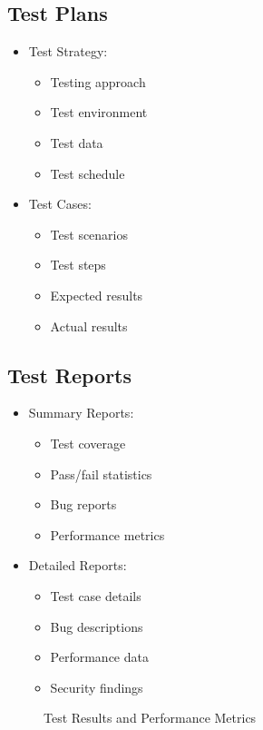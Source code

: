 \subsection{Test Plans}
\begin{itemize}
    \item Test Strategy:
    \begin{itemize}
        \item Testing approach
        \item Test environment
        \item Test data
        \item Test schedule
    \end{itemize}
    \item Test Cases:
    \begin{itemize}
        \item Test scenarios
        \item Test steps
        \item Expected results
        \item Actual results
    \end{itemize}
\end{itemize}

\subsection{Test Reports}
\begin{itemize}
    \item Summary Reports:
    \begin{itemize}
        \item Test coverage
        \item Pass/fail statistics
        \item Bug reports
        \item Performance metrics
    \end{itemize}
    \item Detailed Reports:
    \begin{itemize}
        \item Test case details
        \item Bug descriptions
        \item Performance data
        \item Security findings
    \end{itemize}
\end{itemize}

\begin{figure}[h]
    \centering
    \caption{Test Results and Performance Metrics}
    \label{fig:test-results}
\end{figure}

